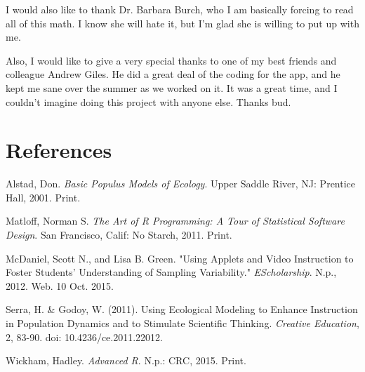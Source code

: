 \documentclass[titlepage]{article}\usepackage[]{graphicx}\usepackage[]{color}
\begin{document}
I would also like to thank Dr. Barbara Burch, who I am basically forcing to read all of this math. I know she will hate it, but I'm glad she is willing to put up with me. 

Also, I would like to give a very special thanks to one of my best friends and colleague Andrew Giles. He did a great deal of the coding for the app, and he kept me sane over the summer as we worked on it. It was a great time, and I couldn't imagine doing this project with anyone else. Thanks bud.

\pagebreak

\section{References}

\begin{bibliography}

Alstad, Don. 
\textit{Basic Populus Models of Ecology}. 
Upper Saddle River, \linebreak
NJ: Prentice Hall, 2001. Print.

\bigskip

Matloff, Norman S. 
\textit{The Art of R Programming: A Tour of Statistical \linebreak Software Design}. 
San Francisco, Calif: No Starch, 2011. Print.

\bigskip

McDaniel, Scott N., and Lisa B. Green. 
"Using Applets and Video \linebreak Instruction to Foster Students' Understanding of Sampling Variability." 
\linebreak \textit{EScholarship}. 
N.p., 2012. Web. 10 Oct. 2015.

\bigskip

Serra, H. & Godoy, W. (2011). 
Using Ecological Modeling to Enhance \linebreak Instruction in Population Dynamics and to Stimulate Scientific Thinking. \textit{Creative Education}, 2, 83-90. 
doi: 10.4236/ce.2011.22012.

\bigskip

Wickham, Hadley. \textit{Advanced R}. N.p.: CRC, 2015. Print.

\end{bibliography}
\end{document}
